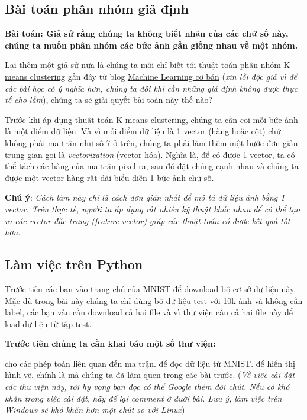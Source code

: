  
 
 
\subsection{Bài toán phân nhóm giả định}
\textbf{Bài toán: Giả sử rằng chúng ta không biết nhãn của các chữ số này, chúng ta muốn phân nhóm các bức ảnh gần giống nhau về một nhóm.} 
 
Lại thêm một giả sử nữa là chúng ta mới chỉ biết tới thuật toán phân nhóm \href{http://machinelearningcoban.com/2017/01/01/kmeans/}{K-means clustering} gần đây từ blog \href{https://tiepvupsu.github.io/}{Machine Learning cơ bản} (\textit{xin lỗi độc giả vì để các bài học có ý nghĩa hơn, chúng ta đôi khi cần những giả định không được thực tế cho lắm}), chúng ta sẽ giải quyết bài toán này thế nào? 
 
Trước khi áp dụng thuật toán \href{http://machinelearningcoban.com/2017/01/01/kmeans/}{K-means clustering}, chúng ta cần coi mỗi bức ảnh là một điểm dữ liệu. Và vì mỗi điểm dữ liệu là 1 vector (hàng hoặc cột) chứ không phải ma trận như số 7 ở trên, chúng ta phải làm thêm một bước đơn giản trung gian gọi là \textit{vectorization} (vector hóa). Nghĩa là, để có được 1 vector, ta có thể tách các hàng của ma trận pixel ra, sau đó đặt chúng cạnh nhau và chúng ta được một vector hàng rất dài biểu diễn 1 bức ảnh chữ số.  
 
\textbf{Chú ý}: \textit{Cách làm này chỉ là cách đơn giản nhất để mô tả dữ liệu ảnh bằng 1 vector. Trên thực tế, người ta áp dụng rất nhiều kỹ thuật khác nhau để có thể tạo ra các vector đặc trưng (feature vector) giúp các thuật toán có được kết quả tốt hơn.} 
 
 
\subsection{Làm việc trên Python}
Trước tiên các bạn vào trang chủ của MNIST để \href{http://yann.lecun.com/exdb/mnist/ }{download} bộ cơ sở dữ liệu này. Mặc dù trong bài này chúng ta chỉ dùng bộ dữ liệu test với 10k ảnh và không cần label, các bạn vẫn cần download cả hai file  và  vì thư viện  cần cả hai file này để load dữ liệu từ tập test. 
 
\textbf{Trước tiên chúng ta cần khai báo một số thư viện:} 
 
 cho các phép toán liên quan đến ma trận. \href{https://pypi.python.org/pypi/python-mnist/}{} để đọc dữ liệu từ MNIST.  để hiển thị hình vẽ.  chính là  mà chúng ta đã làm quen trong các bài trước. (\textit{Về việc cài đặt các thư viện này, tôi hy vọng bạn đọc có thể Google thêm đôi chút. Nếu có khó khăn trong việc cài đặt, hãy để lại comment ở dưới bài. Lưu ý, làm việc trên Windows sẽ khó khăn hơn một chút so với Linux}) 
 
